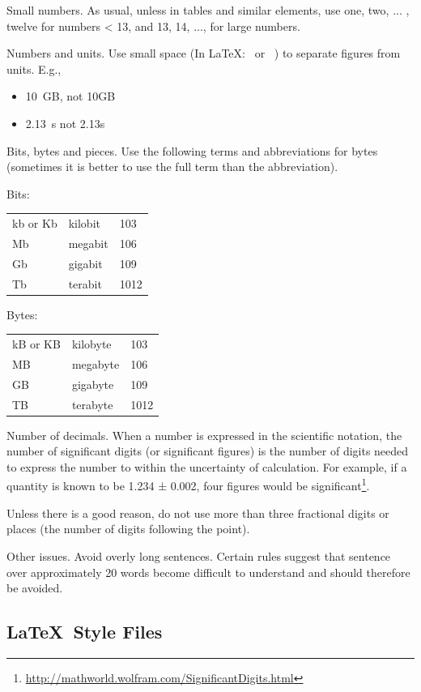 Small numbers. As usual, unless in tables and similar elements, use {one, two, ... , twelve} for numbers < 13, and {13, 14, ..., } for large numbers.

Numbers and units. Use small space (In \LaTeX: \, or ~) to separate figures from units. E.g.,

\begin{itemize}
    \item 10~GB, not 10GB
    \item 2.13~s not 2.13s
\end{itemize}

Bits, bytes and pieces. Use the following terms and abbreviations for bytes (sometimes it is better to use the full term than the abbreviation).

Bits:\\
\begin{tabular}{lll}
    kb or Kb&	kilobit&	103\\
    Mb&	megabit&	106\\
    Gb&	gigabit&	109\\
    Tb&	terabit&	1012\\
\end{tabular}

Bytes:\\
\begin{tabular}{lll}
    kB or KB&	kilobyte&	103\\
    MB&	megabyte&106\\
    GB	&gigabyte	&109\\
    TB	&terabyte	&1012\\
\end{tabular}

Number of decimals. When a number is expressed in the scientific notation, the number of significant digits (or significant figures) is the number of digits needed to express the number to within the uncertainty of calculation. For example, if a quantity is known to be 1.234 ± 0.002, four figures would be significant\footnote{\url{http://mathworld.wolfram.com/SignificantDigits.html}}.

Unless there is a good reason, do not use more than three fractional digits or places (the number of digits following the point).

Other issues. Avoid overly long sentences. Certain rules suggest that sentence over approximately 20 words become difficult to understand and should therefore be avoided.

\subsection{\LaTeX\ Style Files}
\label{sec:latex-style-files}

